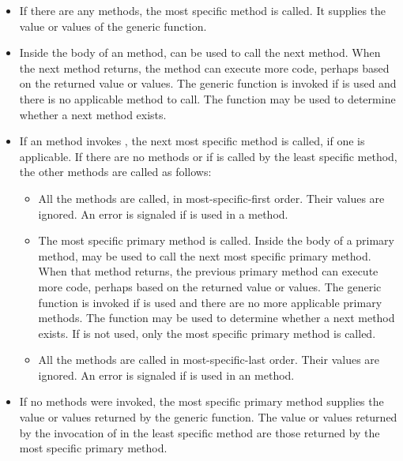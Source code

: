 \begin{itemize}

\item  If there are any  methods, the most specific
 method is called.  It supplies the value or values of the
generic function.

\item  Inside the body of an  method, 
 can be used to call the next method.  When the next
method returns, the  method can execute more code,
perhaps based on the returned value or values.  The generic function
 is invoked if  is used and
there is no applicable method to call.  The function 
 may be used to determine whether a next method exists.

\item  
If an  method invokes , the next
most specific  method is called, if one is applicable.
If there are no  methods or if 
 is called by the least specific 
method, the other methods are called as follows:

\begin{itemize}
\item  All the  methods are called, in
most-specific-first order.  Their values are ignored.
An error is signaled if  is used in a
 method.

\item  The most specific primary method is called.  Inside the
body of a primary method,  may be used to call
the next most specific primary method.  When that method returns, the
previous primary method can execute more code, perhaps based on the
returned value or values.  The generic function 
is invoked if  is used and there are no more
applicable primary methods.  The function  may be
used to determine whether a next method exists.  If 
 is not used, only the most specific primary method
is called.


\item  All the  methods are called in
most-specific-last order.  Their values are ignored.
An error is signaled if  is used in an
 method.
\end{itemize}

\item  If no  methods were invoked, the most
specific primary method supplies the value or values returned by the
generic function.  The value or values returned by the invocation of
 in the least specific  method are
those returned by the most specific primary method.

\end{itemize}

